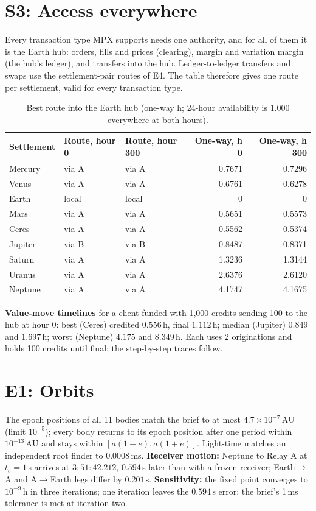 \documentclass[11pt]{article}
\theoremstyle{definition}
\theoremstyle{remark}
\newcommand{\AU}{\,\mathrm{AU}}
\newcommand{\h}{\,\mathrm{h}}
\begin{document}
\section{S3: Access everywhere}\label{app:s3}
Every transaction type MPX supports needs one authority, and for all of them it is the Earth hub: orders, fills and prices (clearing), margin and variation margin (the hub's ledger), and transfers into the hub. Ledger-to-ledger transfers and swaps use the settlement-pair routes of E4. The table therefore gives one route per settlement, valid for every transaction type.
\begin{table}[H]
\centering
\caption{Best route into the Earth hub (one-way h; 24-hour availability is $1.000$ everywhere at both hours).}
\small
\begin{tabular}{@{}lllrr@{}}
\toprule
Settlement & Route, hour 0 & Route, hour 300 & One-way, h 0 & One-way, h 300 \\
\midrule
Mercury & via A & via A & 0.7671 & 0.7296 \\
Venus & via A & via A & 0.6761 & 0.6278 \\
Earth & local & local & 0 & 0 \\
Mars & via A & via A & 0.5651 & 0.5573 \\
Ceres & via A & via A & 0.5562 & 0.5374 \\
Jupiter & via B & via B & 0.8487 & 0.8371 \\
Saturn & via A & via A & 1.3236 & 1.3144 \\
Uranus & via A & via A & 2.6376 & 2.6120 \\
Neptune & via A & via A & 4.1747 & 4.1675 \\
\bottomrule
\end{tabular}
\end{table}
\textbf{Value-move timelines} for a client funded with 1{,}000 credits sending 100 to the hub at hour 0: best (Ceres) credited $0.556\h$, final $1.112\h$; median (Jupiter) $0.849$ and $1.697\h$; worst (Neptune) $4.175$ and $8.349\h$. Each uses 2 originations and holds 100 credits until final; the step-by-step traces follow.



\section{E1: Orbits}\label{app:e1}
The epoch positions of all 11 bodies match the brief to at most $4.7\times10^{-7}\AU$ (limit $10^{-5}$); every body returns to its epoch position after one period within $10^{-13}\AU$ and stays within $[a(1-e),a(1+e)]$. Light-time matches an independent root finder to $0.0008$\,ms. \textbf{Receiver motion:} Neptune to Relay A at $t_e=1\,$s arrives at $3{:}51{:}42.212$, $0.594$\,s later than with a frozen receiver; Earth$\to$A and A$\to$Earth legs differ by $0.201$\,s. \textbf{Sensitivity:} the fixed point converges to $10^{-9}\h$ in three iterations; one iteration leaves the $0.594$\,s error; the brief's 1\,ms tolerance is met at iteration two.
\end{document}
